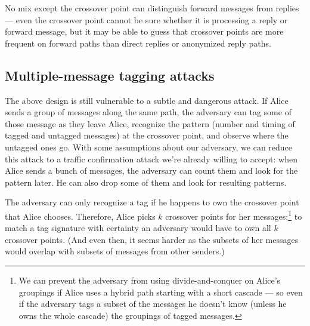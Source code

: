 \documentclass[11pt]{IEEEtran}
\begin{document}
No mix except the crossover point can distinguish forward messages from
replies --- even the crossover point cannot be sure whether it is processing
a reply or forward message, but it may be able to guess that crossover
points are more frequent on forward paths than direct replies or
anonymized reply paths.

\subsection{Multiple-message tagging attacks}
\label{subsec:multi-tagging}

The above design is still vulnerable to a subtle and dangerous
attack. If Alice sends a group of messages along the same path, the
adversary can tag some of those message as they leave Alice, recognize
the pattern (number and timing of tagged and untagged messages) at the
crossover point, and observe where the untagged ones go.
With some assumptions about our adversary, we can reduce
this attack to a traffic confirmation attack we're already willing to
accept: when Alice sends a bunch of messages, the adversary can count
them and look for the pattern later. He can also drop some of them and
look for resulting patterns.

The adversary can only recognize a tag if he happens to own the crossover
point that Alice chooses.
Therefore, Alice picks $k$ crossover points for her
messages;\footnote{
  We can prevent the adversary from using divide-and-conquer on Alice's
  groupings if Alice uses a hybrid path starting with a short cascade ---
  so even if the adversary tags a subset of the messages he doesn't know
  (unless he owns the whole cascade) the groupings of tagged messages.
}
to match a tag signature with certainty an adversary would
have to own all $k$ crossover points.  (And even then, it seems harder
as the subsets of her messages would overlap with subsets of
messages from other senders.)

\end{document}
